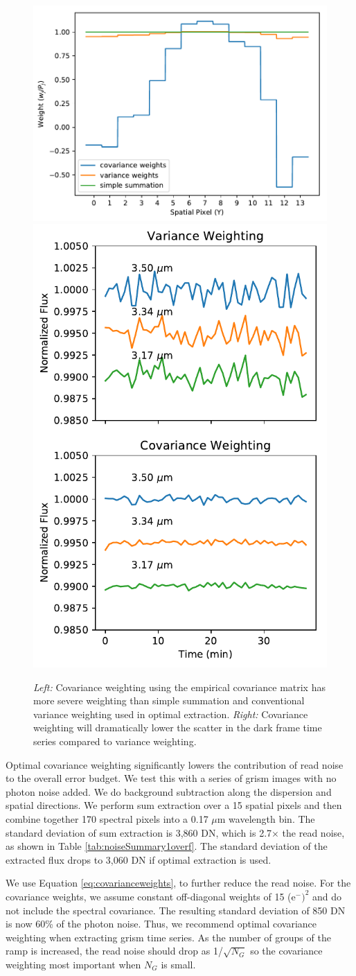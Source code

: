 \documentclass{aastex62}
\begin{document}
\begin{figure}[!hbtp]
\centering
\includegraphics[width=.66\columnwidth]{cov_weighted_weights.pdf}
\includegraphics[width=.32\columnwidth]{zoom_cov_vs_var_tser.pdf}
\caption{ {\it Left:} Covariance weighting using the empirical covariance matrix has more severe weighting than simple summation and conventional variance weighting used in optimal extraction. {\it Right:} Covariance weighting will dramatically lower the scatter in the dark frame time series compared to variance weighting.}\label{fig:covWeightedSummation}
\end{figure}

Optimal covariance weighting significantly lowers the contribution of read noise to the overall error budget.
We test this with a series of grism images with no photon noise added.
We do background subtraction along the dispersion and spatial directions.
We perform sum extraction over a 15 spatial pixels and then combine together 170 spectral pixels into a 0.17 $\mu$m wavelength bin.
The standard deviation of sum extraction is 3,860 DN, which is 2.7$\times$ the read noise, as shown in Table \ref{tab:noiseSummary1overf}.
The standard deviation of the extracted flux drops to 3,060 DN if optimal extraction is used.

We use Equation \ref{eq:covarianceweights}, to further reduce the read noise.
For the covariance weights, we assume constant off-diagonal weights of 15 (e$^-)^2$ and do not include the spectral covariance.
The resulting standard deviation of 850 DN is now 60\% of the photon noise.
Thus, we recommend optimal covariance weighting when extracting grism time series.
As the number of groups of the ramp is increased, the read noise should drop as 1/$\sqrt{N_G}$ so the covariance weighting most important when $N_G$ is small.
\end{document}
